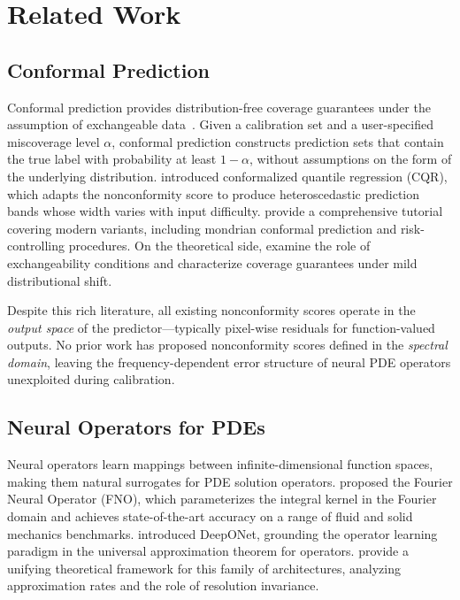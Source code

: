\section{Related Work}
\label{sec:related_work}

\subsection{Conformal Prediction}

Conformal prediction provides distribution-free coverage guarantees under the assumption of exchangeable data~\citep{vovk2005algorithmic,shafer2008tutorial}. Given a calibration set and a user-specified miscoverage level $\alpha$, conformal prediction constructs prediction sets that contain the true label with probability at least $1 - \alpha$, without assumptions on the form of the underlying distribution. \citet{romano2019conformalized} introduced conformalized quantile regression (CQR), which adapts the nonconformity score to produce heteroscedastic prediction bands whose width varies with input difficulty. \citet{angelopoulos2023conformal} provide a comprehensive tutorial covering modern variants, including mondrian conformal prediction and risk-controlling procedures. On the theoretical side, \citet{feldman2021improving} examine the role of exchangeability conditions and characterize coverage guarantees under mild distributional shift.

Despite this rich literature, all existing nonconformity scores operate in the \emph{output space} of the predictor---typically pixel-wise residuals for function-valued outputs. No prior work has proposed nonconformity scores defined in the \emph{spectral domain}, leaving the frequency-dependent error structure of neural PDE operators unexploited during calibration.

\subsection{Neural Operators for PDEs}

Neural operators learn mappings between infinite-dimensional function spaces, making them natural surrogates for PDE solution operators. \citet{li2021fourier} proposed the Fourier Neural Operator (FNO), which parameterizes the integral kernel in the Fourier domain and achieves state-of-the-art accuracy on a range of fluid and solid mechanics benchmarks. \citet{lu2021learning} introduced DeepONet, grounding the operator learning paradigm in the universal approximation theorem for operators. \citet{kovachki2023neural} provide a unifying theoretical framework for this family of architectures, analyzing approximation rates and the role of resolution invariance.

